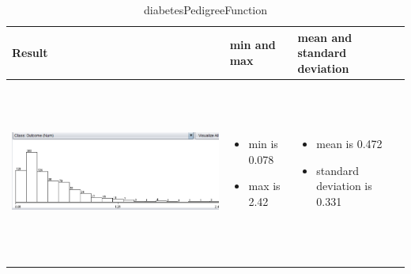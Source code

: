 \documentclass{article}
\begin{document}
\begin{table}[h!]
  \centering
  \begin{tabular}{ | m{5 cm} | m{3cm} | m{3cm} | }
    \hline
   Result &  min and max & mean and standard deviation \\ \hline
    \begin{minipage}{.3\textwidth}
      \includegraphics[width=\linewidth, height=60mm]{diabetes/diabetes.png}
    \end{minipage}
    &
      \begin{itemize}
        \item  min is 0.078
        \item max is 2.42
          
      \end{itemize}
    & 
      \begin{itemize}
        \item  mean is 0.472
        \item  standard deviation is 0.331  
          
      \end{itemize}
    \\ \hline
  \end{tabular}
  \caption{ diabetesPedigreeFunction}\label{tbl:myLboro}
\end{table}
\end{document}
